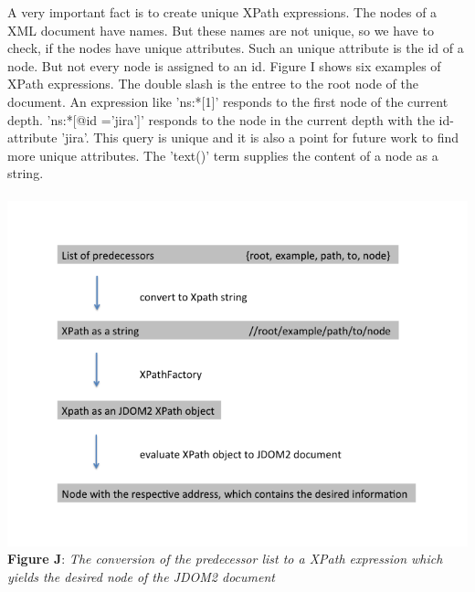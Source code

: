 A very important fact is to create unique XPath expressions. The nodes of a XML document have names. But these names are not unique, so we have to check, if the nodes have unique attributes. Such an unique attribute is the id of a node. But not every node is assigned to an id. Figure I shows six examples of XPath expressions. The double slash is the entree to the root node of the document. An expression like 'ns:*[1]' responds to the first node of the current depth. 'ns:*[@id ='jira']' responds to the node in the current depth with the id-attribute 'jira'. This query is unique and it is also a point for future work to find more unique attributes. The 'text()' term supplies the content of a node as a string. 
\\ \\ \includegraphics[width=1.0\textwidth]{list_to_xpath.png}  \\\textbf{Figure J}: \textit{The conversion of the predecessor list to a XPath expression which yields the desired node of the JDOM2 document}  \\ \\  

